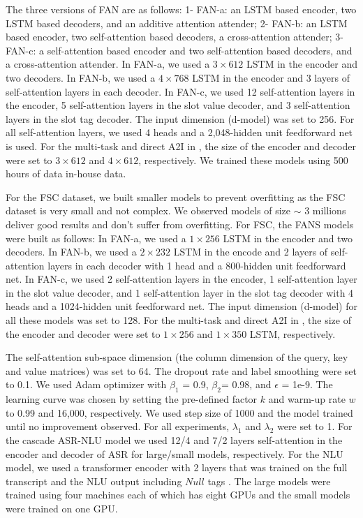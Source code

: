 \documentclass[a4paper]{article}
\begin{document}
The three versions of FAN are as follows: 1- FAN-a: an LSTM based encoder, two LSTM based decoders, and an additive attention attender; 2- FAN-b: an LSTM based encoder, two self-attention based decoders, a cross-attention attender; 3- FAN-c: a self-attention based encoder and two self-attention based decoders, and  a cross-attention attender. In FAN-a, we used a $3\times 612$  LSTM in the encoder and two decoders.   In FAN-b, we used  a $4\times768$   LSTM in the encoder and 3 layers of self-attention layers in each decoder.  In FAN-c, we used 12 self-attention layers in the encoder, 5 self-attention layers in the slot value decoder, and 3 self-attention layers in the slot tag decoder. The input dimension (d-model) was set to 256. For all self-attention layers, we used 4 heads and a 2,048-hidden unit feedforward net is used. For the multi-task and direct A2I  in \cite{haghani2018audio},  the size of the encoder and decoder were set  to $3\times 612$  and $4\times 612$, respectively.  We trained these models using 500 hours of data in-house data. 


For the FSC dataset, we built smaller models to prevent overfitting as the FSC dataset is very small and not complex. We observed models of size $\sim$ 3 millions deliver good results and don't suffer from overfitting. For FSC, the FANS models were built as follows:  In FAN-a, we used a $1\times 256$  LSTM in the encoder and two decoders.   In FAN-b, we used  a $2\times 232$   LSTM in the encode and 2 layers of self-attention layers in each decoder with  1 head and a 800-hidden unit feedforward net.  In FAN-c, we used 2 self-attention layers in the encoder, 1 self-attention layer in the slot value decoder, and 1 self-attention layer in the slot tag decoder with  4 heads and a 1024-hidden unit feedforward net.   The input dimension (d-model) for all these models was set to 128. For the multi-task and direct A2I  in \cite{haghani2018audio},  the size of the encoder and decoder were set  to  $1\times 256$  and $1\times 350$ LSTM, respectively.

The self-attention sub-space dimension (the column dimension of the query, key and value matrices) was set to 64.  The dropout rate and label smoothing were set to 0.1.  We used  Adam optimizer with $\beta_1$ = 0.9, $\beta_2$= 0.98, and $\epsilon$ = 1e-9.  The learning curve was chosen by setting the pre-defined factor $k$ and warm-up rate $w$ to 0.99 and 16,000, respectively. We used step size of 1000 and the model trained until no improvement observed.  For all experiments,  $\lambda_1 $ and $\lambda_2$ were set to 1. For the cascade ASR-NLU model we used 12/4  and 7/2 layers self-attention in the encoder and decoder of ASR for large/small models, respectively. For the NLU model, we used a transformer encoder with 2 layers that was trained on the full transcript and the NLU output including $Null$ tags . The large models were trained using four machines each of which has eight GPUs and the small models were trained on one GPU.
\end{document}
